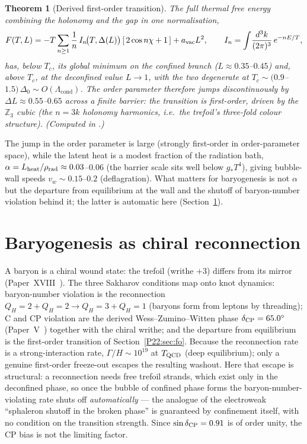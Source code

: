 \documentclass[11pt,a4paper]{article}
\newtheorem{theorem}{Theorem}[section]
\theoremstyle{definition}\newtheorem{definition}[theorem]{Definition}
\newcommand{\Lcond}{\Lambda_{\mathrm{cond}}}
\newcommand{\QH}{Q_H}
\newcommand{\Zthree}{\mathbb{Z}_3}
\begin{document}
\begin{theorem}[Derived first-order transition]
\label{P22:thm:fo}
The full thermal free energy combining the holonomy and the gap in one normalisation,
\begin{equation}
  F(T,L)=-T\sum_{n\ge1}\frac1n\,I_n\!\big(T,\Delta(L)\big)\,[\,2\cos n\chi+1\,]+a_{\rm vac}L^2,
  \qquad I_n=\int\!\frac{d^3k}{(2\pi)^3}\,e^{-nE/T},
  \label{P22:eq:FTL}
\end{equation}
has, below $T_c$, its global minimum on the confined branch ($L\!\approx\!0.35$--$0.45$) and,
above $T_c$, at the deconfined value $L\!\to\!1$, with the two degenerate at
$T_c\sim(0.9$--$1.5)\,\Delta_0\sim O(\Lcond)$. The order parameter therefore jumps
\emph{discontinuously} by $\Delta L\approx0.55$--$0.65$ across a finite barrier: the transition
is first-order, driven by the $\Zthree$ cubic (the $n=3k$ holonomy harmonics, i.e.\ the trefoil's
three-fold colour structure). (Computed in .)
\end{theorem}
\noindent The jump in the order parameter is large (strongly first-order in order-parameter
space), while the latent heat is a modest fraction of the radiation bath,
$\alpha=L_{\rm heat}/\rho_{\rm rad}\approx0.03$--$0.06$ (the barrier scale sits well below
$g_*T^4$), giving bubble-wall speeds $v_w\sim0.15$--$0.2$ (deflagration). What matters for
baryogenesis is not $\alpha$ but the departure from equilibrium at the wall and the shutoff of
baryon-number violation behind it; the latter is automatic here (Section~\ref{P22:sec:baryo}).

\section{Baryogenesis as chiral reconnection}
\label{P22:sec:baryo}
A baryon is a chiral wound state: the trefoil (writhe $+3$) differs from its mirror
(Paper~XVIII~\cite{Paper18}). The three Sakharov conditions map onto knot dynamics:
baryon-number violation is the reconnection $\QH{=}2+\QH{=}2\to\QH{=}3+\QH{=}1$ (baryons form
from leptons by threading); C and CP violation are the derived Wess--Zumino--Witten phase
$\delta_{\rm CP}=65.0^\circ$ (Paper~V~\cite{Paper5}) together with the chiral writhe; and the
departure from equilibrium is the first-order transition of Section~\ref{P22:sec:fo}. Because the
reconnection rate is a strong-interaction rate, $\Gamma/H\sim10^{19}$ at $T_{\rm QCD}$ (deep
equilibrium); only a genuine first-order freeze-out escapes the resulting washout. Here that
escape is structural: a reconnection needs free trefoil strands, which exist only in the
deconfined phase, so once the bubble of confined phase forms the baryon-number-violating rate
shuts off \emph{automatically} --- the analogue of the electroweak ``sphaleron shutoff in the
broken phase'' is guaranteed by confinement itself, with no condition on the transition
strength. Since $\sin\delta_{\rm CP}=0.91$ is of order unity, the CP bias is not the limiting
factor.
\end{document}
